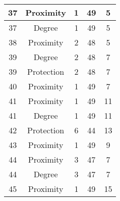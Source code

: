 \documentclass[results.tex]{subfiles}
\begin{document}
\begin{center}
\begin{tabular}{| c || c | c | c | c |}
            \hline
            37                      & Proximity                    & 1                      & 49                      & 5                    \\
            \hline
            37                      & Degree                       & 1                      & 49                      & 5                    \\
            \hline
            38                      & Proximity                    & 2                      & 48                      & 5                    \\
            \hline
            39                      & Degree                       & 2                      & 48                      & 7                    \\
            \hline
            39                      & Protection                   & 2                      & 48                      & 7                    \\
            \hline
            40                      & Proximity                    & 1                      & 49                      & 7                    \\
            \hline
            41                      & Proximity                    & 1                      & 49                      & 11                   \\
            \hline
            41                      & Degree                       & 1                      & 49                      & 11                   \\
            \hline
            42                      & Protection                   & 6                      & 44                      & 13                   \\
            \hline
            43                      & Proximity                    & 1                      & 49                      & 9                    \\
            \hline
            44                      & Proximity                    & 3                      & 47                      & 7                    \\
            \hline
            44                      & Degree                       & 3                      & 47                      & 7                    \\
            \hline
            45                      & Proximity                    & 1                      & 49                      & 15                   \\

\end{tabular}
\end{center}
\end{document}
